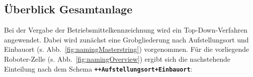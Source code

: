 
\subsection*{Überblick Gesamtanlage}
\label{subsec:namingOverview}


Bei der Vergabe der Betriebsmittelkennzeichnung wird ein Top-Down-Verfahren angewendet. Dabei wird zunächst eine Grobgliederung nach Aufstellungsort und Einbauort (s. Abb.~\ref{fig:namingMasterstring}) vorgenommen. Für die vorliegende Roboter-Zelle (s. Abb.~\ref{fig:namingOverview}) ergibt sich die nachstehende Einteilung nach dem Schema \textbf{\texttt{++Aufstellungsort+Einbauort}}:

